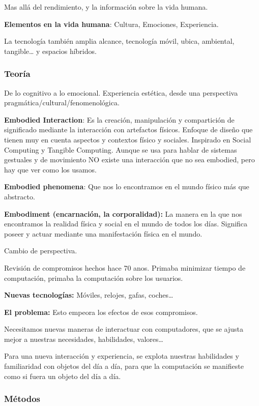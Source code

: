 \documentclass[12pt]{report} %
\begin{document}
Mas allá del rendimiento, y la información sobre la vida humana.

\textbf{Elementos en la vida humana}: Cultura, Emociones, Experiencia.

La tecnología también amplia alcance, tecnología móvil, ubica,
ambiental, tangible\ldots{} y espacios híbridos.

\subsubsection{Teoría}

De lo cognitivo a lo emocional. Experiencia estética, desde una
perspectiva pragmática/cultural/fenomenológica.

\textbf{Embodied Interaction}: Es la creación, manipulación y
compartición de significado mediante la interacción con artefactos
físicos. Enfoque de diseño que tienen muy en cuenta aspectos y contextos
físico y sociales. Inspirado en Social Computing y Tangible Computing.
Aunque se usa para hablar de sistemas gestuales y de movimiento NO
existe una interacción que no sea embodied, pero hay que ver como los
usamos.

\textbf{Embodied phenomena}: Que nos lo encontramos en el mundo físico
más que abstracto.

\textbf{Embodiment (encarnación, la corporalidad):} La manera en la que
nos encontramos la realidad física y social en el mundo de todos los
días. Significa poseer y actuar mediante una manifestación física en el
mundo.

Cambio de perspectiva.

Revisión de compromisos hechos hace 70 anos. Primaba minimizar tiempo de
computación, primaba la computación sobre los usuarios.

\textbf{Nuevas tecnologías:} Móviles, relojes, gafas, coches\ldots{}

\textbf{El problema:} Esto empeora los efectos de esos compromisos.

Necesitamos nuevas maneras de interactuar con computadores, que se
ajusta mejor a nuestras necesidades, habilidades, valores\ldots{}

Para una nueva interacción y experiencia, se explota nuestras habilidades
y familiaridad con objetos del día a día, para que la computación se
manifieste como si fuera un objeto del día a día.

\subsubsection{Métodos}
\end{document}
